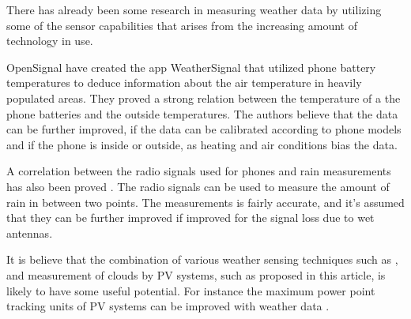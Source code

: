 There has already been some research in measuring weather data by
utilizing some of the sensor capabilities that arises from the
increasing amount of technology in use.

OpenSignal have created the app WeatherSignal that utilized phone
battery temperatures \citep{temperatures2013} to deduce information
about the air temperature in heavily populated areas.  They proved a
strong relation between the temperature of a the phone batteries and
the outside temperatures.  The authors believe that the data can be
further improved, if the data can be calibrated according to phone
models and if the phone is inside or outside, as heating and air
conditions bias the data.

A correlation between the radio signals used for phones and rain
measurements has also been proved \citep{rainfall2007}.  The radio
signals can be used to measure the amount of rain in between two
points.  The measurements is fairly accurate, and it's assumed that
they can be further improved if improved for the signal loss due to
wet antennas.

It is believe that the combination of various weather sensing
techniques such as \cite{rainfall2007}, \cite{temperatures2013} and
measurement of clouds by PV systems, such as proposed in this article,
is likely to have some useful potential.  For instance the maximum
power point tracking units of PV systems can be improved with weather
data \citep{mppt2004}.

